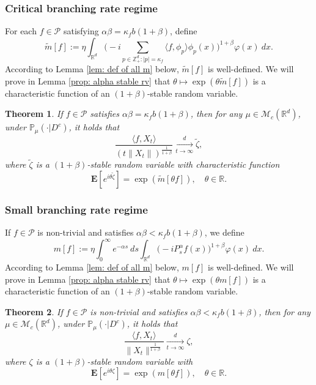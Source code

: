 \documentclass[12pt,a4paper]{amsart}
\theoremstyle{plain}
\newtheorem{thm}{Theorem}[section]
\theoremstyle{definition}
\numberwithin{equation}{section}
\begin{document}
\subsubsection{Critical branching rate regime}
    For each $f\in \mathcal{P}$ satisfying $\alpha\beta=\kappa_f b(1+\beta)$, define
\begin{equation}\label{tilde-m}
    \widetilde{m}[f]
        := \eta\int_{\mathbb R^d} \Big(-i\sum_{p\in \mathbb Z_+^d:|p|=\kappa_f}\langle f,\phi_p\rangle\phi_p(x)\Big)^{1+\beta} \varphi(x)~dx.
\end{equation}
    According to Lemma \ref{lem: def of all m} below, $\widetilde m[f]$ is well-defined.
   We will prove in Lemma \ref{prop: alpha stable rv} that
   $\theta \mapsto \exp(\theta \widetilde m[f])$
    is a characteristic function of an $(1+\beta)$-stable random variable.
\begin{thm}
\label{thm: critical clt}
    If $f\in\mathcal{P}$ satisfies  $\alpha\beta=\kappa_fb(1+\beta)$, then for any $\mu\in \mathcal M_c(\mathbb R^d)$,
    under $\mathbb{P}_{\mu}(\cdot|D^c)$,
    it holds that
\[
    \frac{\langle f,X_t\rangle}{\left(t\|X_t\|\right)^{\frac{1}{1+\beta}}}
        \xrightarrow[t\to \infty]{d} \tilde{\zeta},
\]
    where $\tilde{\zeta}$ is a $(1+\beta)$-stable random variable with
    characteristic function
\[
     \mathbf E [e^{i\theta \tilde{\zeta}}]
    =\exp(\widetilde{m}[\theta f]),
    \quad \theta\in \mathbb R.
\]
\end{thm}

\subsubsection{Small branching rate regime}
\label{msmallcase}
	If $f\in \mathcal{P}$ is non-trivial and satisfies  $\alpha\beta<\kappa_f b(1+\beta)$, 
	we define
\begin{equation}
    m[f]
    :=\eta \int_0^{\infty} e^{-\alpha s} ~ds\int_{\mathbb R^d} \big(-iP_s^\alpha f(x)\big)^{1+\beta} \varphi(x)~dx.
\end{equation}
	According to Lemma \ref{lem: def of all m} below, $m[f]$ is well-defined.
	We will prove  in Lemma \ref{prop: alpha stable rv} that $\theta \mapsto \exp(\theta m[f])$ is a characteristic function of an $(1+\beta)$-stable random variable.
\begin{thm}
\label{thm: small clt}
       If $f\in\mathcal{P}$ is non-trivial and satisfies $\alpha\beta<\kappa_f b(1+\beta)$, 
    then for any $\mu\in \mathcal M_c(\mathbb R^d)$, under $\mathbb{P}_{\mu}(\cdot|D^c)$, it holds that
\[
        \frac{\langle f,X_t\rangle}{\|X_t\|^{\frac{1}{1+\beta}}}\xrightarrow[t\rightarrow \infty]{d} \zeta,
\]
    where $\zeta$ is a $(1+\beta)$-stable random variable with
\[
       \mathbf E[e^{i\theta \zeta}]
    =\exp(m[\theta f]),
    \quad \theta\in \mathbb R.
\]
\end{thm}
\end{document}
